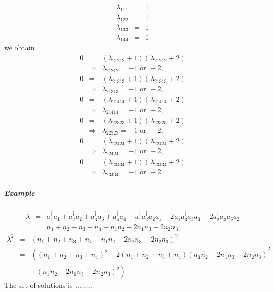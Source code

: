 \documentclass[12pt]{article}
\begin{document}
\begin{eqnarray*}
\lambda _{111} &=&1 \\
\lambda _{122} &=&1 \\
\lambda _{133} &=&1 \\
\lambda _{144} &=&1
\end{eqnarray*}%
we obtain 
\begin{eqnarray*}
0 &=&\left( \lambda _{21212}+1\right) \left( \lambda _{21212}+2\right) \\
&\Rightarrow &\lambda _{21212}=-1\text{ or }-2,
\end{eqnarray*}%
\begin{eqnarray*}
0 &=&\left( \lambda _{21313}+1\right) \left( \lambda _{21313}+2\right) \\
&\Rightarrow &\lambda _{21313}=-1\text{ or }-2,
\end{eqnarray*}%
\begin{eqnarray*}
0 &=&\left( \lambda _{21414}+1\right) \left( \lambda _{21414}+2\right) \\
&\Rightarrow &\lambda _{21414}=-1\text{ or }-2,
\end{eqnarray*}%
\begin{eqnarray*}
0 &=&\left( \lambda _{22323}+1\right) \left( \lambda _{22323}+2\right) \\
&\Rightarrow &\lambda _{22323}=-1\text{ or }-2,
\end{eqnarray*}%
\begin{eqnarray*}
0 &=&\left( \lambda _{22424}+1\right) \left( \lambda _{22424}+2\right) \\
&\Rightarrow &\lambda _{22424}=-1\text{ or }-2,
\end{eqnarray*}%
\begin{eqnarray*}
0 &=&\left( \lambda _{23434}+1\right) \left( \lambda _{23434}+2\right) \\
&\Rightarrow &\lambda _{23434}=-1\text{ or }-2.
\end{eqnarray*}

\subparagraph{Example}

\begin{eqnarray*}
\lambda &=&a_{1}^{\dagger }a_{1}+a_{2}^{\dagger }a_{2}+a_{3}^{\dagger
}a_{3}+a_{4}^{\dagger }a_{4}-a_{1}^{\dagger }a_{2}^{\dagger
}a_{2}a_{1}-2a_{1}^{\dagger }a_{3}^{\dagger }a_{3}a_{1}-2a_{2}^{\dagger
}a_{3}^{\dagger }a_{3}a_{2} \\
&=&n_{1}+n_{2}+n_{3}+n_{4}-n_{1}n_{2}-2n_{1}n_{3}-2n_{2}n_{3}
\end{eqnarray*}%
\begin{eqnarray*}
\lambda ^{2} &=&\left(
n_{1}+n_{2}+n_{3}+n_{4}-n_{1}n_{2}-2n_{1}n_{3}-2n_{2}n_{3}\right) ^{2} \\
&=&\left( \left( n_{1}+n_{2}+n_{3}+n_{4}\right) ^{2}-2\left(
n_{1}+n_{2}+n_{3}+n_{4}\right) \left(
n_{1}n_{2}-2n_{1}n_{3}-2n_{2}n_{3}\right) \right. ^{2} \\
&&\left. +\left( n_{1}n_{2}-2n_{1}n_{3}-2n_{2}n_{3}\right) ^{2}\right)
\end{eqnarray*}%
The set of solutions is .........
\end{document}
